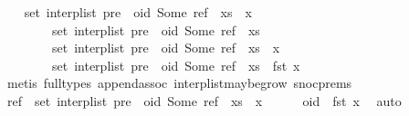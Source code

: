 \begin{isabellebody}
\ \ \isamarkupfalse%
\ {\isachardoublequoteopen}set\ {\isacharparenleft}interp{\isacharunderscore}list\ {\isacharparenleft}{\isacharparenleft}pre\ {\isacharat}\ {\isacharbrackleft}{\isacharparenleft}oid{\isacharcomma}\ Some\ ref{\isacharparenright}{\isacharbrackright}\ {\isacharat}\ xs{\isacharparenright}\ {\isacharat}\ {\isacharbrackleft}x{\isacharbrackright}{\isacharparenright}{\isacharparenright}\ {\isacharequal}\isanewline
\ \ \ \ \ \ \ \ set\ {\isacharparenleft}interp{\isacharunderscore}list\ {\isacharparenleft}pre\ {\isacharat}\ {\isacharbrackleft}{\isacharparenleft}oid{\isacharcomma}\ Some\ ref{\isacharparenright}{\isacharbrackright}\ {\isacharat}\ xs{\isacharparenright}{\isacharparenright}\ {\isasymor}\isanewline
\ \ \ \ \ \ \ \ set\ {\isacharparenleft}interp{\isacharunderscore}list\ {\isacharparenleft}{\isacharparenleft}pre\ {\isacharat}\ {\isacharbrackleft}{\isacharparenleft}oid{\isacharcomma}\ Some\ ref{\isacharparenright}{\isacharbrackright}\ {\isacharat}\ xs{\isacharparenright}\ {\isacharat}\ {\isacharbrackleft}x{\isacharbrackright}{\isacharparenright}{\isacharparenright}\ {\isacharequal}\isanewline
\ \ \ \ \ \ \ \ set\ {\isacharparenleft}interp{\isacharunderscore}list\ {\isacharparenleft}pre\ {\isacharat}\ {\isacharbrackleft}{\isacharparenleft}oid{\isacharcomma}\ Some\ ref{\isacharparenright}{\isacharbrackright}\ {\isacharat}\ xs{\isacharparenright}{\isacharparenright}\ {\isasymunion}\ {\isacharbraceleft}fst\ x{\isacharbraceright}{\isachardoublequoteclose}\isanewline
\ \ \ \ \isamarkupfalse%
\ {\isacharparenleft}metis\ {\isacharparenleft}full{\isacharunderscore}types{\isacharparenright}\ append{\isachardot}assoc\ interp{\isacharunderscore}list{\isacharunderscore}maybe{\isacharunderscore}grow{}\ snoc{\isachardot}prems{\isacharparenleft}{}{\isacharparenright}{\isacharparenright}\isanewline
\ \ \isamarkupfalse%
\ \isamarkupfalse%
\ {\isachardoublequoteopen}ref\ {\isasymnotin}\ set\ {\isacharparenleft}interp{\isacharunderscore}list\ {\isacharparenleft}pre\ {\isacharat}\ {\isacharbrackleft}{\isacharparenleft}oid{\isacharcomma}\ Some\ ref{\isacharparenright}{\isacharbrackright}\ {\isacharat}\ xs\ {\isacharat}\ {\isacharbrackleft}x{\isacharbrackright}{\isacharparenright}{\isacharparenright}{\isachardoublequoteclose}\isanewline
\ \ \ \ \isamarkupfalse%
\ {\isacartoucheopen}oid\ {\isacharless}\ fst\ x{\isacartoucheclose}\ \isamarkupfalse%
\ auto\isanewline
{}\isamarkupfalse%
%
\endisatagproof
{\isafoldproof}%

\end{isabellebody}
